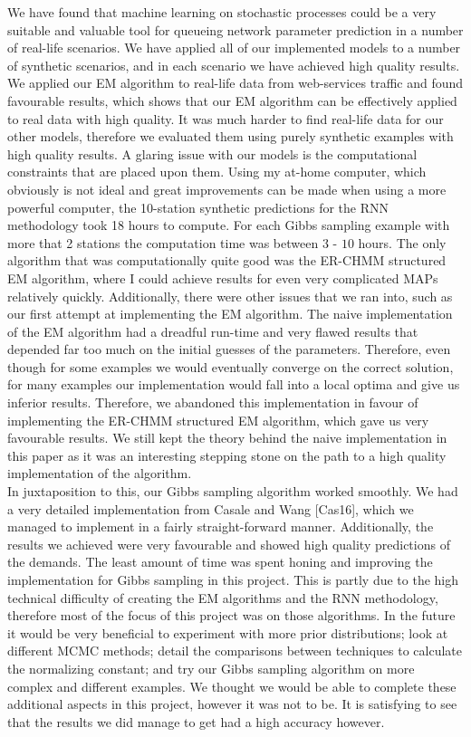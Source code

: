 \documentclass[a4paper,11pt,titlepage]{article}
\begin{document}
We have found that machine learning on stochastic processes could be a very suitable and valuable tool for queueing network parameter prediction in a number of real-life scenarios. We have applied all of our implemented models to a number of synthetic scenarios, and in each scenario we have achieved high quality results. We applied our EM algorithm to real-life data from web-services traffic and found favourable results, which shows that our EM algorithm can be effectively applied to real data with high quality. It was much harder to find real-life data for our other models, therefore we evaluated them using purely synthetic examples with high quality results. A glaring issue with our models is the computational constraints that are placed upon them. Using my at-home computer, which obviously is not ideal and great improvements can be made when using a more powerful computer, the 10-station synthetic predictions for the RNN methodology took 18 hours to compute. For each Gibbs sampling example with more that 2 stations the computation time was between $3$ - $10$ hours. The only algorithm that was computationally quite good was the ER-CHMM structured EM algorithm, where I could achieve results for even very complicated MAPs relatively quickly. Additionally, there were other issues that we ran into, such as our first attempt at implementing the EM algorithm. The naive implementation of the EM algorithm had a dreadful run-time and very flawed results that depended far too much on the initial guesses of the parameters. Therefore, even though for some examples we would eventually converge on the correct solution, for many examples our implementation would fall into a local optima and give us inferior results. Therefore, we abandoned this implementation in favour of implementing the ER-CHMM structured EM algorithm, which gave us very favourable results. We still kept the theory behind the naive implementation in this paper as it was an interesting stepping stone on the path to a high quality implementation of the algorithm. \\

In juxtaposition to this, our Gibbs sampling algorithm worked smoothly. We had a very detailed implementation from Casale and Wang [Cas16], which we managed to implement in a fairly straight-forward manner. Additionally, the results we achieved were very favourable and showed high quality predictions of the demands. The least amount of time was spent honing and improving the implementation for Gibbs sampling in this project. This is partly due to the high technical difficulty of creating the EM algorithms and the RNN methodology, therefore most of the focus of this project was on those algorithms. In the future it would be very beneficial to experiment with more prior distributions; look at different MCMC methods; detail the comparisons between techniques to calculate the normalizing constant; and try our Gibbs sampling algorithm on more complex and different examples. We thought we would be able to complete these additional aspects in this project, however it was not to be. It is satisfying to see that the results we did manage to get had a high accuracy however.  \\
\end{document}
